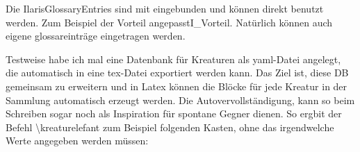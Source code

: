 \documentclass{Ilaris}
\begin{document}




Die IlarisGlossaryEntries sind mit eingebunden und können direkt benutzt werden. Zum Beispiel der Vorteil \gls{angepasstI_Vorteil}. Natürlich können auch eigene
\gls{glossareinträge} eingetragen werden.



\spaltenumbruch

Testweise habe ich mal eine Datenbank für Kreaturen als yaml-Datei angelegt, die automatisch in eine tex-Datei exportiert werden kann. Das Ziel ist, diese DB gemeinsam zu erweitern und in Latex können die Blöcke für jede Kreatur in der Sammlung automatisch erzeugt werden. Die Autovervollständigung, kann so beim Schreiben sogar noch als Inspiration für spontane Gegner dienen. So ergbit der Befehl \textbackslash kreaturelefant zum Beispiel folgenden Kasten, ohne das irgendwelche Werte angegeben werden müssen:

\kreaturelefant

\kreaturbaumdrache

\spaltenende


\renewcommand*{\glossarysection}[2][]{%
    \twocolumn[{\chapter*{#2}}]%
    \setlength\glsdescwidth{0.6\linewidth}%
    \glsglossarymark{\glossarytoctitle}%
}
\renewcommand*{\glossarypostamble}{\onecolumn}

\glossar
\end{document}
